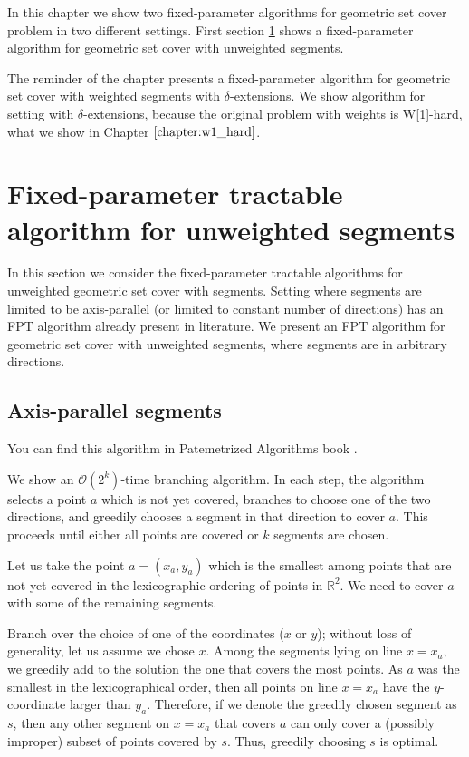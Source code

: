 In this chapter we show two fixed-parameter algorithms
for geometric set cover problem in two different settings.
First section \ref{section:fpt_unweighted} shows 
a fixed-parameter algorithm for geometric set cover with unweighted segments.

The reminder of the chapter presents
a fixed-parameter algorithm for geometric set cover with weighted segments
with $\delta$-extensions. We show algorithm for setting with $\delta$-extensions,
because the original problem with weights is W[1]-hard,
what we show in Chapter $\ref{chapter:w1_hard}$.


\section{Fixed-parameter tractable algorithm for unweighted segments}
\label{section:fpt_unweighted}
In this section we consider the fixed-parameter tractable
algorithms for unweighted geometric set cover with segments.
Setting where segments are limited to be axis-parallel
(or limited to constant number of directions) has an FPT
algorithm already present in literature.
We present an FPT algorithm for geometric set cover
with unweighted segments, where segments are in arbitrary directions.

\subsection{Axis-parallel segments}
You can find this algorithm in Patemetrized Algorithms book \cite{platypus_book}.

We show an $\mathcal{O}(2^k)$-time branching algorithm.
In each step, the algorithm selects a point $a$ which is not yet covered,
branches to choose one of the two directions, and greedily chooses
a segment in that direction to cover $a$.
This proceeds until either all points are covered or $k$ segments are chosen.

Let us take
the point $a=(x_a,y_a)$ which is the smallest 
among points that are not yet covered
in the lexicographic ordering
of points in $\mathbb{R}^2$.
We need to cover $a$ with some of the remaining segments.

Branch over the choice of one of the coordinates ($x$ or $y$);
without loss of generality, let us assume we chose $x$.
Among the segments lying on line $x = x_a$,
we greedily add to the solution the one that covers the most points.
As $a$ was the smallest in the lexicographical order,
then all points on line $x = x_a$ have the $y$-coordinate larger than $y_a$.
Therefore, if we denote the greedily chosen segment as $s$,
then any other segment on $x = x_a$ that covers $a$ can only
cover a (possibly improper) subset of points covered by $s$.
Thus, greedily choosing $s$ is optimal.

